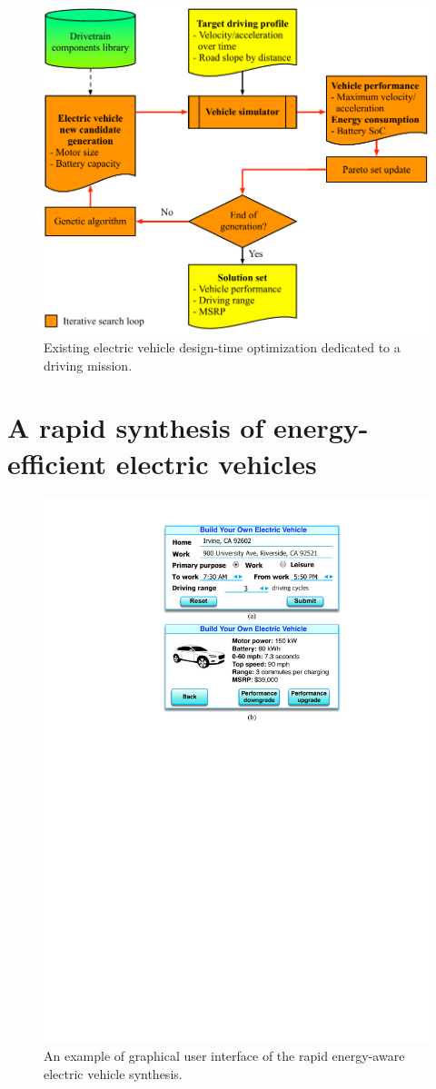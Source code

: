 \documentclass[journal]{IEEEtran}
\begin{document}
\begin{figure}
\centering
\includegraphics[width=1.0\hsize]{Figures/Framework_existing.pdf}
\caption{Existing electric vehicle design-time optimization dedicated to a driving mission.}
\label{fig:framework_existing}
\end{figure}    

\section{A rapid synthesis of energy-efficient electric vehicles}

\begin{figure}
\centering
\includegraphics[width=0.7\hsize]{Figures/GUI.pdf}
\caption{An example of graphical user interface of the rapid energy-aware electric vehicle synthesis.}
\label{fig:GUI}
\end{figure}    
\end{document}
